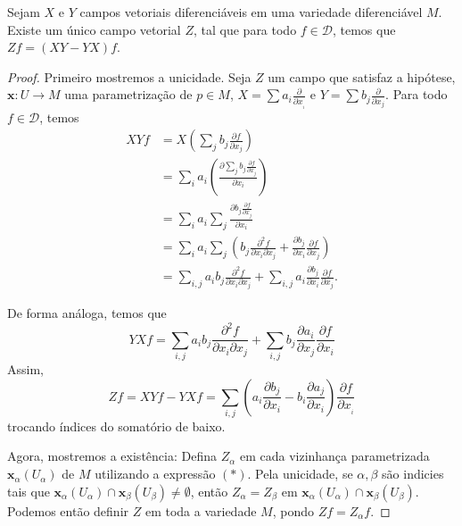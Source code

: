 \begin{lemma}
    \label{loc:5.2_lema_:_campo_vetorial_colchetes}
    Sejam $X$ e $Y$ campos vetoriais diferenciáveis em uma variedade diferenciável $M$. Existe um único campo vetorial $Z$, tal que para todo $f \in \mathcal{D}$, temos que $Zf=(XY-YX)f$.
    \begin{proof}

        Primeiro mostremos a unicidade.
        Seja $Z$ um campo que satisfaz a hipótese, $\mathbf{x}:U\to M$ uma parametrização de $p \in M$,  $X=\sum a_{i}\frac{\partial}{\partial x_{_{i}}}$ e $Y=\sum b_{j}\frac{\partial}{\partial x_{j}}$.
        Para todo $f \in \mathcal{D}$, temos
        \begin{align*}
            XYf & = X\left( \sum_{j}b_{j}\frac{\partial f}{\partial x_{j}} \right)                                                                                                       \\
                & = \sum_{i}a_{i}\left( \frac{\partial \sum_{j}b_{j}\frac{\partial f}{\partial x_{j}}}{\partial x_{i}} \right)                                                           \\
                & = \sum_{i}a_{i}\sum_{j}\frac{\partial b_{j}\frac{\partial f}{\partial x_{j}}}{\partial x_{i}}                                                                          \\
                & = \sum_{i}a_{i}\sum_{j}\left( b_{j}\frac{\partial^{2}f}{\partial x_{i} \partial x_{j}} +\frac{\partial b_{j}}{\partial x_{i}}\frac{\partial f}{\partial x_{j}} \right) \\
                & = \sum_{i, j}a_{i}b_{j}\frac{\partial^{2}f}{\partial x_{i}\partial x_{j}} + \sum_{i,j}a_{i}\frac{\partial b_{j}}{\partial x_{i}} \frac{\partial f}{\partial x_{j}}.
        \end{align*}

        De forma análoga, temos que
        \begin{equation*}
            YXf = \sum_{i, j}a_{i}b_{j}\frac{\partial^{2}f}{\partial x_{i}\partial x_{j}} + \sum_{i,j}b_{j}\frac{\partial a_{i}}{\partial x_{j}} \frac{\partial f}{\partial x_{i}}
        \end{equation*}
        Assim,
        \begin{equation*}
            Zf = XYf-YXf =\sum_{i,j}\left( a_{i}\frac{\partial b_{j}}{\partial x_{i}}-b_{i}\frac{\partial a_{j}}{\partial x_{i}} \right)\frac{\partial f}{\partial x_{_{i}}} \tag{*}
        \end{equation*}
        trocando índices do somatório de baixo.

        Agora, mostremos a existência:
        Defina $Z_{\alpha}$ em cada vizinhança parametrizada $\mathbf{x}_{\alpha}(U_{\alpha})$ de $M$ utilizando a expressão $(*)$. Pela unicidade, se $\alpha, \beta$ são indicies tais que $\mathbf{x}_{\alpha}(U_{\alpha})\cap \mathbf{x}_{\beta}(U_{\beta})\neq \emptyset$, então $Z_{\alpha}=Z_{\beta}$ em $\mathbf{x}_{\alpha}(U_{\alpha})\cap \mathbf{x}_{\beta}(U_{\beta})$. Podemos então definir $Z$ em toda a variedade $M$, pondo $Zf=Z_{\alpha}f$.
    \end{proof}
\end{lemma}
